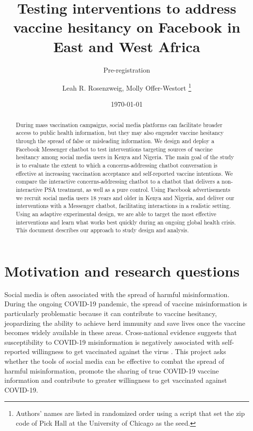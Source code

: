 \documentclass[letterpaper, 12pt, parskip=full,DIV=10]{scrartcl}
\title{Testing interventions to address vaccine hesitancy on Facebook in East and West Africa}
\subtitle{Pre-registration}
\author{Leah R. Rosenzweig, Molly Offer-Westort \thanks{Authors' names are listed in randomized order using a script that set the zip code of Pick Hall at the University of Chicago as the seed. } }%
\date{\today}
\begin{document}
%

\maketitle%

\begin{abstract}
During mass vaccination campaigns, social media platforms can facilitate broader access to public health information, but they may also engender vaccine hesitancy through the spread of false or misleading information. We design and deploy a Facebook Messenger chatbot to test interventions targeting sources of vaccine hesitancy among social media users in Kenya and Nigeria. The main goal of the study is to evaluate the extent to which a concerns-addressing chatbot conversation is effective at increasing vaccination acceptance and self-reported vaccine intentions. We compare the interactive concerns-addressing chatbot to a chatbot that delivers a non-interactive PSA treatment, as well as a pure control. Using Facebook advertisements we recruit social media users 18 years and older in Kenya and Nigeria, and deliver our interventions with a Messenger chatbot, facilitating interactions in a realistic setting. Using an adaptive experimental design, we are able to target the most effective interventions and learn what works best quickly during an ongoing global health crisis. This document describes our approach to study design and analysis. 

\end{abstract}

\clearpage

\tableofcontents%
\clearpage



\section{Motivation and research questions}
Social media is often associated with the spread of harmful misinformation. During the ongoing COVID-19 pandemic, the spread of vaccine misinformation is particularly problematic because it can contribute to vaccine hesitancy, jeopardizing the ability to achieve herd immunity and save lives once the vaccine becomes widely available in these areas. Cross-national evidence suggests that susceptibility to COVID-19 misinformation is negatively associated with self-reported willingness to get vaccinated against the virus \citep{roozenbeek2020susceptibility}. This project asks whether the tools of social media can be effective to combat the spread of harmful misinformation, promote the sharing of true COVID-19 vaccine information and contribute to greater willingness to get vaccinated against COVID-19. 
\end{document}
